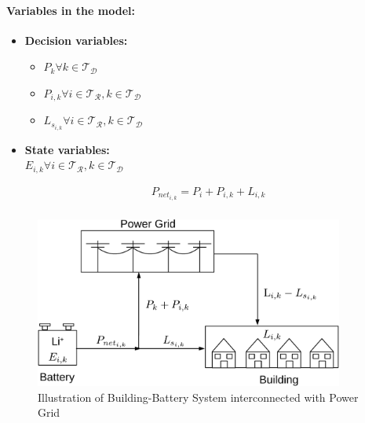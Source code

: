\documentclass[11pt,twoside]{article}
\begin{document}
\paragraph{Variables in the model:}
\begin{itemize}
\item \textbf{Decision variables:}
\begin{itemize}
\item $P_{k} \forall k \in \mathcal{T_D}$ 
\item $P_{i,k} \forall i \in \mathcal{T_R}, k \in \mathcal{T_D} $
\item $L_{s_{i,k}} \forall i \in \mathcal{T_R}, k \in \mathcal{T_D} $
\end{itemize}
\item \textbf{State variables:}\\
$E_{i,k} \forall i \in \mathcal{T_R}, k \in \mathcal{T_D} $
\end{itemize}
\begin{subequations}
\begin{align}
&P_{{net}_{i,k}} = P_{i} + P_{i,k} + L_{i,k}\\
\end{align}
\label{eq:Pnet}
\end{subequations}

\begin{figure}[h!]
\begin{center}
\includegraphics[width=4in]{Figures/system_blocks-crop.pdf} \caption{Illustration of Building-Battery System interconnected with Power Grid}\label{fig:loads_scenarios}\end{center}
\end{figure}
\FloatBarrier
\end{document}
